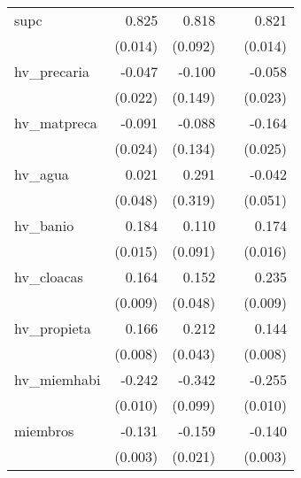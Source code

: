 {\begin{longtable}{l*{4}{D{.}{.}{-1}}}
\addlinespace
supc        &       0.825\sym{***}&       0.818\sym{***}&                     &       0.821\sym{***}\\
            &     (0.014)         &     (0.092)         &                     &     (0.014)         \\
\addlinespace
hv\_precaria &      -0.047\sym{*}  &      -0.100         &                     &      -0.058\sym{*}  \\
            &     (0.022)         &     (0.149)         &                     &     (0.023)         \\
\addlinespace
hv\_matpreca &      -0.091\sym{***}&      -0.088         &                     &      -0.164\sym{***}\\
            &     (0.024)         &     (0.134)         &                     &     (0.025)         \\
\addlinespace
hv\_agua     &       0.021         &       0.291         &                     &      -0.042         \\
            &     (0.048)         &     (0.319)         &                     &     (0.051)         \\
\addlinespace
hv\_banio    &       0.184\sym{***}&       0.110         &                     &       0.174\sym{***}\\
            &     (0.015)         &     (0.091)         &                     &     (0.016)         \\
\addlinespace
hv\_cloacas  &       0.164\sym{***}&       0.152\sym{**} &                     &       0.235\sym{***}\\
            &     (0.009)         &     (0.048)         &                     &     (0.009)         \\
\addlinespace
hv\_propieta &       0.166\sym{***}&       0.212\sym{***}&                     &       0.144\sym{***}\\
            &     (0.008)         &     (0.043)         &                     &     (0.008)         \\
\addlinespace
hv\_miemhabi &      -0.242\sym{***}&      -0.342\sym{***}&                     &      -0.255\sym{***}\\
            &     (0.010)         &     (0.099)         &                     &     (0.010)         \\
\addlinespace
miembros    &      -0.131\sym{***}&      -0.159\sym{***}&                     &      -0.140\sym{***}\\
            &     (0.003)         &     (0.021)         &                     &     (0.003)         \\

\end{longtable}}
